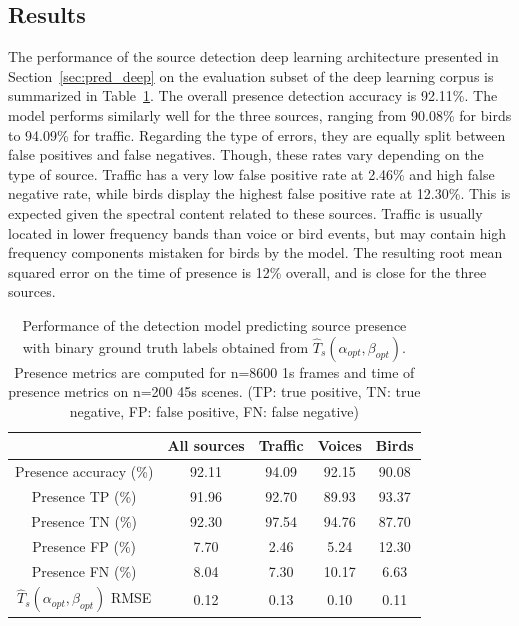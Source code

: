 \documentclass[twocolumn]{article}
\begin{document}
\subsection{Results}
\label{sec:pred_res}

The performance of the source detection deep learning architecture presented in Section~\ref{sec:pred_deep} on the evaluation subset of the deep learning corpus is summarized in Table~\ref{tab:perf_cmp}. The overall presence detection accuracy is 92.11\%. The model performs similarly well for the three sources, ranging from 90.08\% for birds to 94.09\% for traffic. Regarding the type of errors, they are equally split between false positives and false negatives. Though, these rates vary depending on the type of source. Traffic has a very low false positive rate at 2.46\% and high false negative rate, while birds display the highest false positive rate at 12.30\%. This is expected given the spectral content related to these sources. Traffic is usually located in lower frequency bands than voice or bird events, but may contain high frequency components mistaken for birds by the model. The resulting root mean squared error on the time of presence is 12\% overall, and is close for the three sources.

\begin{table}[h!]
\centering
\caption{Performance of the detection model predicting source presence with binary ground truth labels obtained from $\hat T_s(\alpha_{opt}, \beta_{opt})$. Presence metrics are computed for n=8600 1s frames and time of presence metrics on n=200 45s scenes. (TP: true positive, TN: true negative, FP: false positive, FN: false negative)}
\label{tab:perf_cmp}
\begin{tabular}{ c | c | c c c }
\hline
	 & All sources & Traffic & Voices & Birds \\ \hline
	Presence accuracy (\%) &  92.11 & 94.09 & 92.15 & 90.08 \\
	Presence TP (\%) & 91.96 & 92.70 & 89.93 & 93.37 \\
	Presence TN (\%) & 92.30 & 97.54 & 94.76 & 87.70 \\
	Presence FP (\%) & 7.70 & 2.46 & 5.24 & 12.30 \\
	Presence FN (\%) & 8.04 & 7.30 & 10.17 & 6.63 \\ \hline
	$\hat T_s(\alpha_{opt}, \beta_{opt})$ RMSE & 0.12 & 0.13 & 0.10 & 0.11 \\
\end{tabular}
\end{table}
\end{document}
